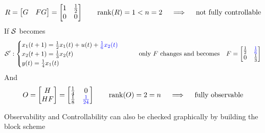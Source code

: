 \begin{example}[SISO system of order $n=2$]
    \[
        R = \begin{bmatrix}
            G & FG
        \end{bmatrix} = \begin{bmatrix}
            1 & \frac{1}{2} \\
            0 & 0
        \end{bmatrix}
        \qquad
        \operatorname*{rank} (R) = 1 < n = 2
        \quad\implies\quad \text{not fully controllable}
    \]
    If $\mathcal{S}$ becomes 
    \begin{align*}
    \mathcal{S'}: 
        \begin{cases}
            x_1(t+1) = \frac{1}{2} x_1(t) + u(t) + \color{blue}\frac{1}{6} x_2(t)\\
            x_2(t+1) = \frac{1}{3}x_2(t) \\
            y(t) = \frac{1}{4}x_1(t)
        \end{cases}
        \qquad
        \text{only $F$ changes and becomes}\quad
        F = \begin{bmatrix}
            \frac{1}{2} & \color{blue}\frac{1}{6} \\
            0 & \frac{1}{3}
        \end{bmatrix}
    \end{align*} 
    And     
    \[
        O = \begin{bmatrix}
            H \\
            HF
        \end{bmatrix} = \begin{bmatrix}
            \frac{1}{4} & 0 \\
            \frac{1}{8} & \color{blue}\frac{1}{24}
        \end{bmatrix}
        \qquad
        \operatorname*{rank} (O) = 2 = n         \quad\implies\quad \text{fully observable}
    \]
    
    Observability and Controllability can also be checked graphically by building the block scheme 
    
      \begin{figure}[H]
        \centering
\end{figure}
\end{example}
